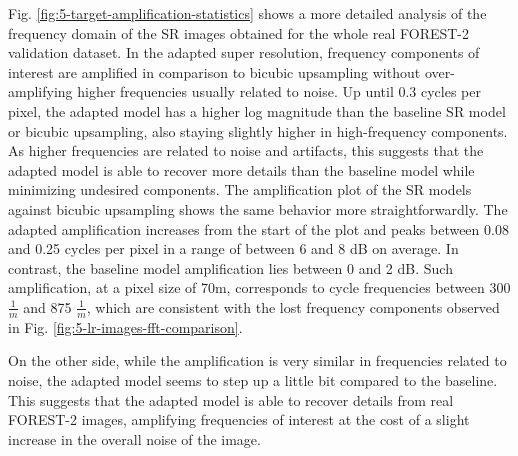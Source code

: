         Fig. \ref{fig:5-target-amplification-statistics} shows a more detailed analysis of the frequency domain of the SR images obtained for the whole real FOREST-2 validation dataset.
        In the adapted super resolution, frequency components of interest are amplified in comparison to bicubic upsampling without over-amplifying higher frequencies usually related to noise. Up until 0.3 cycles per pixel, the adapted model has a higher log magnitude than the baseline SR model or bicubic upsampling, also staying slightly higher in high-frequency components.
        As higher frequencies are related to noise and artifacts, this suggests that the adapted model is able to recover more details than the baseline model while minimizing undesired components.
        The amplification plot of the SR models against bicubic upsampling shows the same behavior more straightforwardly. 
        The adapted amplification increases from the start of the plot and peaks between 0.08 and 0.25 cycles per pixel in a range of between 6 and 8 dB on average. In contrast, the baseline model amplification lies between 0 and 2 dB.
        Such amplification, at a pixel size of 70m, corresponds to cycle frequencies between  300 $\frac{1}{m}$ and 875 $\frac{1}{m}$, which are consistent with the lost frequency components observed in Fig. \ref{fig:5-lr-images-fft-comparison}.
        
        On the other side, while the amplification is very similar in frequencies related to noise, the adapted model seems to step up a little bit compared to the baseline.  
        This suggests that the adapted model is able to recover details from real FOREST-2 images, amplifying frequencies of interest at the cost of a slight increase in the overall noise of the image.


